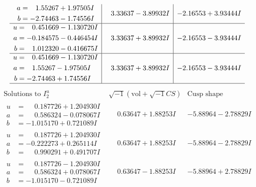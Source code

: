 \documentclass[1p]{elsarticle_modified}
\theoremstyle{definition}
\newcommand{\I}{\sqrt{-1}}
\begin{document}
$$\begin{array}{c|c|c}
\begin{aligned}
a &= \phantom{-}1.55267 + 1.97505 I \\
b &= -2.74463 - 1.74556 I\end{aligned}
 & \phantom{-}3.33637 - 3.89932 I & -2.16553 + 3.93444 I \\ \hline\begin{aligned}
u &= \phantom{-}0.451669 - 1.130720 I \\
a &= -0.184575 - 0.446454 I \\
b &= \phantom{-}1.012320 - 0.416675 I\end{aligned}
 & \phantom{-}3.33637 + 3.89932 I & -2.16553 - 3.93444 I \\ \hline\begin{aligned}
u &= \phantom{-}0.451669 - 1.130720 I \\
a &= \phantom{-}1.55267 - 1.97505 I \\
b &= -2.74463 + 1.74556 I\end{aligned}
 & \phantom{-}3.33637 + 3.89932 I & -2.16553 - 3.93444 I\\
 \hline 
 \end{array}$$\newpage$$\begin{array}{c|c|c}  
\text{Solutions to }I^u_{2}& \I (\text{vol} + \sqrt{-1}CS) & \text{Cusp shape}\\
 \hline 
\begin{aligned}
u &= \phantom{-}0.187726 + 1.204930 I \\
a &= \phantom{-}0.586324 - 0.078067 I \\
b &= -1.015170 + 0.721089 I\end{aligned}
 & \phantom{-}0.63647 + 1.88253 I & -5.88964 - 2.78829 I \\ \hline\begin{aligned}
u &= \phantom{-}0.187726 + 1.204930 I \\
a &= -0.222273 + 0.265114 I \\
b &= \phantom{-}0.990291 + 0.491707 I\end{aligned}
 & \phantom{-}0.63647 + 1.88253 I & -5.88964 - 2.78829 I \\ \hline\begin{aligned}
u &= \phantom{-}0.187726 - 1.204930 I \\
a &= \phantom{-}0.586324 + 0.078067 I \\
b &= -1.015170 - 0.721089 I\end{aligned}
 & \phantom{-}0.63647 - 1.88253 I & -5.88964 + 2.78829 I \\ \hline\begin{aligned}

\end{aligned}
\end{array}$$
\end{document}
